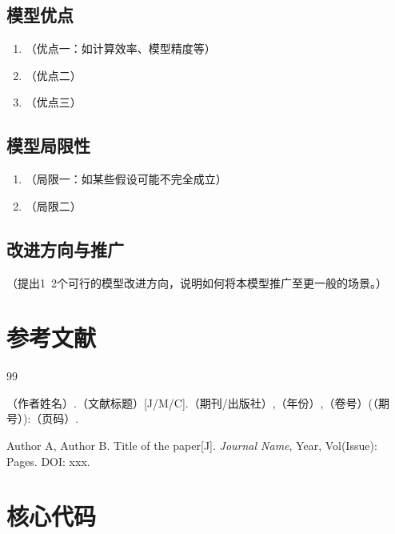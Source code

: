 \documentclass[12pt, a4paper]{article}
\begin{document}
\subsection{模型优点}

\begin{enumerate}
    \item （优点一：如计算效率、模型精度等）
    \item （优点二）
    \item （优点三）
\end{enumerate}

\subsection{模型局限性}

\begin{enumerate}
    \item （局限一：如某些假设可能不完全成立）
    \item （局限二）
\end{enumerate}

\subsection{改进方向与推广}

（提出1~2个可行的模型改进方向，说明如何将本模型推广至更一般的场景。）

\section*{参考文献}

\begin{thebibliography}{99}

（作者姓名）.（文献标题）[J/M/C].（期刊/出版社）,（年份）,（卷号）(（期号）):（页码）.

Author A, Author B. Title of the paper[J]. \textit{Journal Name}, Year, Vol(Issue): Pages. DOI: xxx.


\end{thebibliography}

\appendix
\section{核心代码}
\end{document}
